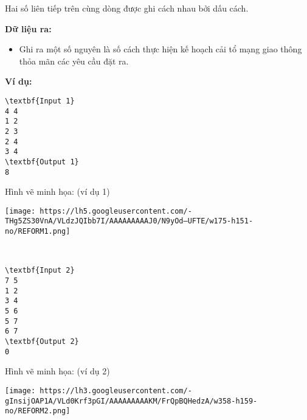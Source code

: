 Hai số liên tiếp trên cùng dòng được ghi cách nhau bởi dấu cách.

\textbf{Dữ liệu ra: }
\begin{itemize}
	\item Ghi ra một số nguyên là số cách thực hiện kế hoạch cải tổ mạng giao thông thỏa mãn các yêu cầu đặt ra.
\end{itemize}

\textbf{Ví dụ: }
\begin{verbatim}
\textbf{Input 1}
4 4
1 2
2 3
2 4
3 4
\textbf{Output 1}
8\end{verbatim}

Hình vẽ minh họa: (ví dụ 1)


\texttt{[image: https://lh5.googleusercontent.com/-THg5ZS30VnA/VLdzJQIbb7I/AAAAAAAAAJ0/N9yOd--UFTE/w175-h151-no/REFORM1.png]}

 
\begin{verbatim}
\textbf{Input 2}
7 5
1 2
3 4
5 6
5 7
6 7
\textbf{Output 2}
0\end{verbatim}

Hình vẽ minh họa: (ví dụ 2)


\texttt{[image: https://lh3.googleusercontent.com/-gInsijOAP1A/VLd0Krf3pGI/AAAAAAAAAKM/FrQpBQHedzA/w358-h159-no/REFORM2.png]}